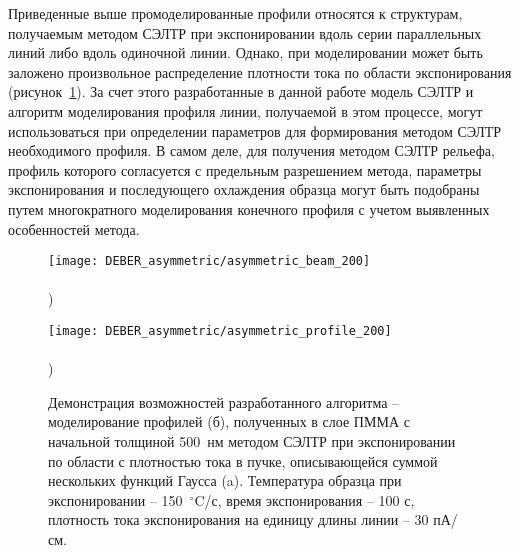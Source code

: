 Приведенные выше промоделированные профили относятся к структурам, получаемым методом СЭЛТР при экспонировании вдоль серии параллельных линий либо вдоль одиночной линии.
Однако, при моделировании может быть заложено произвольное распределение плотности тока по области экспонирования (рисунок~\ref{fig:DEBER_multibeam}).
За счет этого разработанные в данной работе модель СЭЛТР и алгоритм моделирования профиля линии, получаемой в этом процессе, могут использоваться при определении параметров для формирования методом СЭЛТР необходимого профиля.
В самом деле, для получения методом СЭЛТР рельефа, профиль которого согласуется с предельным разрешением метода, параметры экспонирования и последующего охлаждения образца могут быть подобраны путем многократного моделирования конечного профиля с учетом выявленных особенностей метода.

\begin{figure}[h]	
	\begin{minipage}{0.48\textwidth}
		\texttt{[image: DEBER\_asymmetric/asymmetric\_beam\_200]} \\
		\vspace{-12em} \\ ) \\ \vspace{12em}
	\end{minipage}
	\begin{minipage}{0.48\textwidth}
		\texttt{[image: DEBER\_asymmetric/asymmetric\_profile\_200]} \\
		\vspace{-12em} \\ ) \\ \vspace{12em}
	\end{minipage}
	\vspace{-3.5em}
	\caption{Демонстрация возможностей разработанного алгоритма -- моделирование профилей (б), полученных в слое ПММА с начальной толщиной 500~нм методом СЭЛТР при экспонировании по области с плотностью тока в пучке, описывающейся суммой нескольких функций Гаусса (a). Температура образца при экспонировании -- 150~$^\circ$C/с, время экспонирования -- 100 с, плотность тока экспонирования на единицу длины линии -- 30 пА/см.}
	\label{fig:DEBER_multibeam}
	\vspace{2em}
\end{figure}
